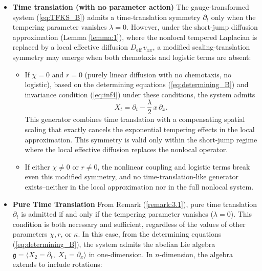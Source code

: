 \documentclass{article}
\begin{document}

\begin{itemize}
\item[\textbf{(a)}] \textbf{Time translation (with no parameter action)}
The gauge-transformed system (\ref{eq:TFKS_B}) admits a time-translation symmetry $\partial_t$ only when the tempering parameter vanishes $\lambda= 0$. However, under the short-jump diffusion approximation (Lemma \ref{lemma:1}), where the nonlocal tempered Laplacian is replaced by a local effective diffusion $D_{\mathrm{eff}}\,v_{xx}$, a modified scaling-translation symmetry may emerge when both chemotaxis and logistic terms are absent:
\begin{itemize}
\item[$\bullet$]
If $\chi=0$ and $r=0$ (purely linear diffusion with no chemotaxis, no logistic), based on the determining equations (\ref{eq:determining_B}) and invariance condition (\ref{eq:inf4}) under these conditions, the system admits
\begin{equation*}
X_{t}=\partial_t-\frac{\lambda}{2}\,x\,\partial_x.\,
\end{equation*}
This generator combines time translation with a compensating spatial scaling that exactly cancels the exponential tempering effects in the local approximation. This symmetry is valid only within the short-jump regime where the local effective diffusion replaces the nonlocal operator.
\item[$\bullet$] 
If either $\chi\neq 0$ or $r\neq 0$, the nonlinear coupling and logistic terms break even this modified symmetry, and no time-translation-like generator exists--neither in the local approximation nor in the full nonlocal system.
\end{itemize}
\item[\textbf{(b)}] \textbf{Pure Time Translation} From Remark (\ref{remark:3.1}), pure time translation $\partial_t$ is admitted if and only if the tempering parameter vanishes ($\lambda=0$). This condition is both necessary and sufficient, regardless of the values of other parameters $\chi, r$, or $\kappa$. In this case, from the determining equations (\ref{eq:determining_B}), the system admits the abelian Lie algebra $\mathfrak g=\langle X_2=\partial_t,\; X_1=\partial_x\rangle$ in one-dimension. In $n$-dimension, the algebra extends to include rotations: 

\end{itemize}
\end{document}
